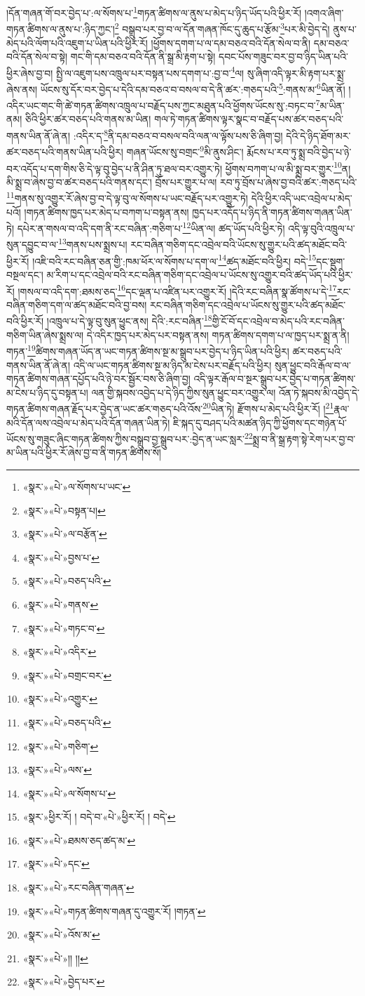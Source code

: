 །དོན་གཞན་གོ་བར་བྱེད་པ་:ལ་སོགས་པ་\footnote{«སྣར་»«པེ་»ལ་སོགས་པ་ཡང་}གཏན་ཚིགས་ལ་ནུས་པ་མེད་པ་ཉིད་ཡོད་པའི་ཕྱིར་རོ། །འགའ་ཞིག་གཏན་ཚིགས་ལ་ནུས་པ་:ཉིད་ཀྱང་།\footnote{«སྣར་»«པེ་»བསྟན་པ།} བསྒྲུབ་པར་བྱ་བ་ལ་དོན་གཞན་ཁོང་དུ་ཆུད་པ་རྩོམ་\footnote{«སྣར་»«པེ་»ལ་བརྩོན་}པར་མི་བྱེད་དེ། ནུས་པ་མེད་པའི་ལོག་པའི་འཇུག་པ་ཡིན་པའི་ཕྱིར་རོ། །ཕྱོགས་དགག་པ་ལ་དམ་བཅའ་བའི་དོན་སེལ་བ་ནི། དམ་བཅའ་བའི་དོན་སེལ་བ་སྟེ། གང་གི་དམ་བཅའ་བའི་དོན་ནི་སྒྲ་མི་རྟག་པ་སྟེ། དབང་པོས་གཟུང་བར་བྱ་བ་ཉིད་ཡིན་པའི་ཕྱིར་ཞེས་བྱ་བ། སྤྱི་ལ་འཇུག་པས་འཁྲུལ་པར་བསྟན་པས་དགག་པ་:བྱ་བ་\footnote{«སྣར་»«པེ་»བྱས་པ་}ལ། སུ་ཞིག་འདི་ལྟར་མི་རྟག་པར་སྨྲ་ཞེས་ནས། ཡོངས་སུ་དོར་བར་བྱེད་པ་དེའི་དམ་བཅའ་བ་བསལ་བ་དེ་ནི་ཚར་:གཅད་པའི་\footnote{«སྣར་»«པེ་»བཅད་པའི་}:གནས་མ་\footnote{«སྣར་»«པེ་»གནས་}ཡིན་ནོ། །འདིར་ཡང་གང་གི་ཚེ་གཏན་ཚིགས་འཁྲུལ་པ་བརྗོད་པས་ཀྱང་མཐུན་པའི་ཕྱོགས་ཡོངས་སུ་:བཏང་བ་\footnote{«སྣར་»«པེ་»གཏང་བ་}མ་ཡིན་ནམ། ཅིའི་ཕྱིར་ཚར་བཅད་པའི་གནས་མ་ཡིན། གལ་ཏེ་གཏན་ཚིགས་ལྟར་སྣང་བ་བརྗོད་པས་ཚར་བཅད་པའི་གནས་ཡིན་ནོ་ཞེ་ན། :འདིར་ད་\footnote{«སྣར་»«པེ་»འདིར་}ནི་དམ་བཅའ་བ་བསལ་བའི་ལན་ལ་ལྟོས་པས་ཅི་ཞིག་བྱ། དེའི་དེ་ཉིད་ཐོག་མར་ཚར་བཅད་པའི་གནས་ཡིན་པའི་ཕྱིར། གཞན་ཡོངས་སུ་བགྲང་\footnote{«སྣར་»«པེ་»བགྲང་བར་}མི་ནུས་ཤིང་། རྨོངས་པ་རབ་ཏུ་སྨྲ་བའི་བྱེད་པ་ཉེ་བར་འདོད་པ་དག་གིས་ཅི་དེ་ལྟ་བུ་བྱེད་པ་ནི་ཤིན་ཏུ་ཐལ་བར་འགྱུར་ཏེ། ཕྱོགས་བཀག་པ་ལ་མི་སྨྲ་བར་གྱུར་\footnote{«སྣར་»«པེ་»འགྱུར་}ན། མི་སྨྲ་བ་ཞེས་བྱ་བ་ཚར་བཅད་པའི་གནས་དང་། བྲོས་པར་གྱུར་པ་ལ། རབ་ཏུ་བྲོས་པ་ཞེས་བྱ་བའི་ཚར་:གཅད་པའི་\footnote{«སྣར་»«པེ་»བཅད་པའི་}གནས་སུ་འགྱུར་རོ་ཞེས་བྱ་བ་དེ་ལྟ་བུ་ལ་སོགས་པ་ཡང་བརྗོད་པར་འགྱུར་ཏེ། དེའི་ཕྱིར་འདི་ཡང་འབྲེལ་པ་མེད་པའོ། །གཏན་ཚིགས་ཁྱད་པར་མེད་པ་བཀག་པ་བསྟན་ནས། ཁྱད་པར་འདོད་པ་ཉིད་ནི་གཏན་ཚིགས་གཞན་ཡིན་ཏེ། དཔེར་ན་གསལ་བ་འདི་དག་ནི་རང་བཞིན་:གཅིག་པ་\footnote{«སྣར་»«པེ་»གཅིག་}ཡིན་ལ། ཚད་ཡོད་པའི་ཕྱིར་ཏེ། འདི་ལྟ་བུའི་འཁྲུལ་པ་སུན་དབྱུང་བ་ལ་\footnote{«སྣར་»«པེ་»ལས་}གནས་པས་སྨྲས་པ། རང་བཞིན་གཅིག་དང་འབྲེལ་བའི་ཡོངས་སུ་གྱུར་པའི་ཚད་མཐོང་བའི་ཕྱིར་རོ། །འཇི་བའི་རང་བཞིན་ཅན་གྱི་:ཁམ་ཕོར་ལ་སོགས་པ་དག་ལ་\footnote{«སྣར་»«པེ་»ལ་སོགས་པ་}ཚད་མཐོང་བའི་ཕྱིར། བདེ་\footnote{«སྣར་»ཕྱིར་རོ། ། བདེ་བ་«པེ་»ཕྱིར་རོ། ། བདེ་}དང་སྡུག་བསྔལ་དང་། མ་རིག་པ་དང་འབྲེལ་བའི་རང་བཞིན་གཅིག་དང་འབྲེལ་པ་ཡོངས་སུ་འགྱུར་བའི་ཚད་ཡོད་པའི་ཕྱིར་རོ། །གསལ་བ་འདི་དག་:ཐམས་ཅད་\footnote{«སྣར་»«པེ་»ཐམས་ཅད་ཚད་མ་}དང་ལྡན་པ་འཛིན་པར་འགྱུར་རོ། །དེའི་རང་བཞིན་སྣ་ཚོགས་པ་དེ་\footnote{«སྣར་»«པེ་»དང་}རང་བཞིན་གཅིག་དག་ལ་ཚད་མཐོང་བའི་བྱ་བས། རང་བཞིན་གཅིག་དང་འབྲེལ་པ་ཡོངས་སུ་གྱུར་པའི་ཚད་མཐོང་བའི་ཕྱིར་རོ། །འཁྲུལ་པ་དེ་ལྟ་བུ་སུན་ཕྱུང་ནས། དེའི་:རང་བཞིན་\footnote{«སྣར་»«པེ་»རང་བཞིན་གཞན་}གྱི་ངོ་བོ་དང་འབྲེལ་བ་མེད་པའི་རང་བཞིན་གཅིག་ཡིན་ཞེས་སྨྲས་ལ། དེ་འདིར་ཁྱད་པར་མེད་པར་བསྟན་ནས། གཏན་ཚིགས་དགག་པ་ལ་ཁྱད་པར་སྨྲ་ན་ནི། གཏན་\footnote{«སྣར་»«པེ་»གཏན་ཚིགས་གཞན་དུ་འགྱུར་རོ། །གཏན་}ཚིགས་གཞན་ཡོད་ན་ཡང་གཏན་ཚིགས་སྔ་མ་སྒྲུབ་པར་བྱེད་པ་ཉིད་ཡིན་པའི་ཕྱིར། ཚར་བཅད་པའི་གནས་ཡིན་ནོ་ཞེ་ན། འདི་ལ་ཡང་གཏན་ཚིགས་སྔ་མ་ཉིད་མ་ངེས་པར་བརྗོད་པའི་ཕྱིར། སུན་ཕྱུང་བའི་རྒོལ་བ་ལ་གཏན་ཚིགས་གཞན་དཔྱོད་པའི་ཉེ་བར་སྦྱོར་བས་ཅི་ཞིག་བྱ། འདི་ལྟར་རྒོལ་བ་སྔར་སྒྲུབ་པར་བྱེད་པ་གཏན་ཚིགས་མ་ངེས་པ་ཉིད་དུ་བསྟན་པ། ལན་གྱི་སྐབས་འབྱེད་པ་དེ་ཉིད་ཀྱིས་སུན་ཕྱུང་བར་འགྱུར་ལ། འོན་ཏེ་སྐབས་མི་འབྱེད་དེ་གཏན་ཚིགས་གཞན་རྗོད་པར་བྱེད་ན་ཡང་ཚར་གཅད་པའི་འོས་\footnote{«སྣར་»«པེ་»འོས་མ་}ཡིན་ཏེ། རྫོགས་པ་མེད་པའི་ཕྱིར་རོ། །\footnote{«སྣར་»«པེ་»།། །།}རྣལ་མའི་དོན་ལས་འབྲེལ་པ་མེད་པའི་དོན་གཞན་ཡིན་ཏེ། ཇི་སྐད་དུ་བཤད་པའི་མཚན་ཉིད་ཀྱི་ཕྱོགས་དང་གཉེན་པོ་ཡོངས་སུ་གཟུང་ཞིང་གཏན་ཚིགས་ཀྱིས་བསྒྲུབ་བྱ་སྒྲུབ་པར་:བྱེད་ན་ཡང་སླར་\footnote{«སྣར་»«པེ་»བྱེད་པར་}སྨྲ་བ་ནི་སྒྲ་རྟག་སྟེ་རེག་པར་བྱ་བ་མ་ཡིན་པའི་ཕྱིར་རོ་ཞེས་བྱ་བ་ནི་གཏན་ཚིགས་སོ། 